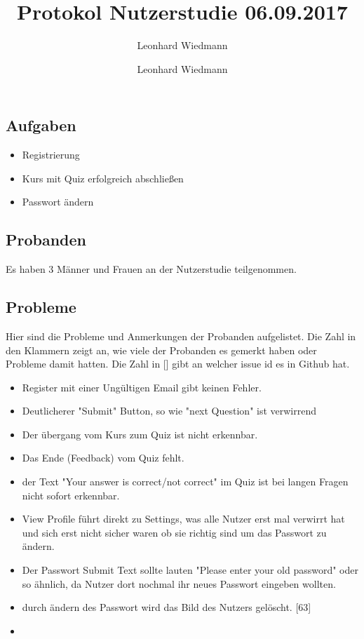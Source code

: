 \documentclass[colorback, accentcolor=tud1c, paper=a4]{tudexercise}
\title{Protokol Nutzerstudie 06.09.2017}
\subtitle{Leonhard Wiedmann}
\author{Leonhard Wiedmann}
\begin{document}
\maketitle
\subsection*{Aufgaben}
	\begin{itemize}
	\item Registrierung
  \item Kurs mit Quiz erfolgreich abschließen
  \item Passwort ändern
	\end{itemize}

\subsection*{Probanden}
Es haben 3 Männer und Frauen an der Nutzerstudie teilgenommen.

\subsection*{Probleme}
  Hier sind die Probleme und Anmerkungen der Probanden aufgelistet. Die Zahl in den Klammern zeigt an, wie viele der Probanden es gemerkt haben oder Probleme damit hatten. Die Zahl in [] gibt an welcher issue id es in Github hat.
  \begin{itemize}
		\item Register mit einer Ungültigen Email gibt keinen Fehler.
    \item Deutlicherer "Submit" Button, so wie "next Question" ist verwirrend
		\item Der übergang vom Kurs zum Quiz ist nicht erkennbar.
		\item Das Ende (Feedback) vom Quiz fehlt.
		\item der Text "Your answer is correct/not correct" im Quiz ist bei langen Fragen nicht sofort erkennbar.
		\item View Profile führt direkt zu Settings, was alle Nutzer erst mal verwirrt hat und sich erst nicht sicher waren ob sie richtig sind um das Passwort zu ändern.
		\item Der Passwort Submit Text sollte lauten "Please enter your old password" oder so ähnlich, da Nutzer dort nochmal ihr neues Passwort eingeben wollten.
		\item durch ändern des Passwort wird das Bild des Nutzers gelöscht. [63]
		\item
   \end{itemize}
\end{document}
